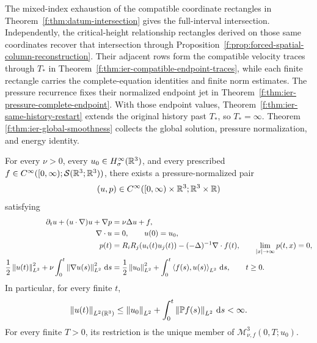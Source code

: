 The mixed-index exhaustion of the compatible coordinate rectangles in
Theorem~\ref{f:thm:datum-intersection} gives the full-interval intersection.
Independently, the critical-height relationship rectangles derived on those
same coordinates recover that intersection through
Proposition~\ref{f:prop:forced-spatial-column-reconstruction}.
Their adjacent rows form the compatible velocity traces through \(T_*\) in
Theorem~\ref{f:thm:ier-compatible-endpoint-traces}, while each finite rectangle
carries the complete-equation identities and finite norm estimates.  The pressure
recurrence fixes their normalized endpoint jet in
Theorem~\ref{f:thm:ier-pressure-complete-endpoint}.  With those endpoint
values, Theorem~\ref{f:thm:ier-same-history-restart} extends the original
history past \(T_*\), so \(T_*=\infty\).  Theorem
\ref{f:thm:ier-global-smoothness} collects the global solution, pressure
normalization, and energy identity.

\begin{samepage}
\begin{theorem}
\label{f:thm:ier-global-smoothness}
For every \(\nu>0\), every \(u_0\in H^\infty_\sigma(\mathbb R^3)\), and every prescribed
\(f\in C^\infty([0,\infty);\mathcal S(\mathbb R^3;\mathbb R^3))\), there exists a
pressure-normalized pair
\begin{equation}
 (u,p)\in C^\infty([0,\infty)\times\mathbb R^3;\mathbb R^3\times\mathbb R)
 \label{f:eq:ier-global-class}
\end{equation}
satisfying
\begin{align}
 \partial_tu+(u\cdot\nabla)u+\nabla p&=\nu\Delta u+f,
 \label{f:eq:ier-global-momentum}\\
 \nabla\cdot u&=0,
 \qquad u(0)=u_0,
 \label{f:eq:ier-global-divergence-datum}\\
 p(t)&=R_iR_j(u_i(t)u_j(t))-(-\Delta)^{-1}\nabla\cdot f(t),
 \qquad \lim_{|x|\to\infty}p(t,x)=0,
 \label{f:eq:ier-global-pressure}\\
 \frac12\left\lVert u(t)\right\rVert_{L^2}^2
 +\nu\int_0^t\left\lVert \nabla u(s)\right\rVert_{L^2}^2\,\mathrm d s
 &=\frac12\left\lVert u_0\right\rVert_{L^2}^2
 +\int_0^t\left\langle f(s),u(s)\right\rangle_{L^2}\,\mathrm d s,
 \qquad t\ge0.
 \label{f:eq:ier-global-energy}
\end{align}
In particular, for every finite \(t\),
\begin{equation}
 \left\lVert u(t)\right\rVert_{L^2(\mathbb R^3)}
 \le\left\lVert u_0\right\rVert_{L^2}+\int_0^t\left\lVert \mathbb P f(s)\right\rVert_{L^2}\,\mathrm d s<\infty.
 \label{f:eq:ier-global-energy-bound}
\end{equation}
For every finite \(T>0\), its restriction is the unique member of
\(\mathscr M_{\nu,f}^3(0,T;u_0)\).
\end{theorem}
\end{samepage}

